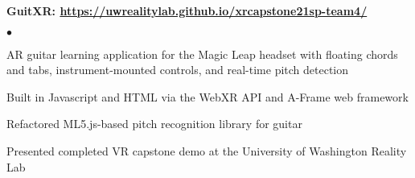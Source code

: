 \documentclass[margin,line]{res}
\newenvironment{list2}{
  \begin{list}{$\bullet$}{%
      \setlength{\itemsep}{0in}
      \setlength{\parsep}{0in} \setlength{\parskip}{0in}
      \setlength{\topsep}{0in} \setlength{\partopsep}{0in} 
      \setlength{\leftmargin}{0.2in}} \raggedright}{\end{list}}
\begin{document}
\begin{resume}
{\bf GuitXR: \url{https://uwrealitylab.github.io/xrcapstone21sp-team4/}} %
\begin{list2}
\item AR guitar learning application for the Magic Leap headset with floating chords and tabs, instrument-mounted controls, and real-time pitch detection
\item Built in Javascript and HTML via the WebXR API and A-Frame web framework
\item Refactored ML5.js-based pitch recognition library for guitar
\item Presented completed VR capstone demo at the University of Washington Reality Lab
\end{list2}




\end{resume}
\end{document}
